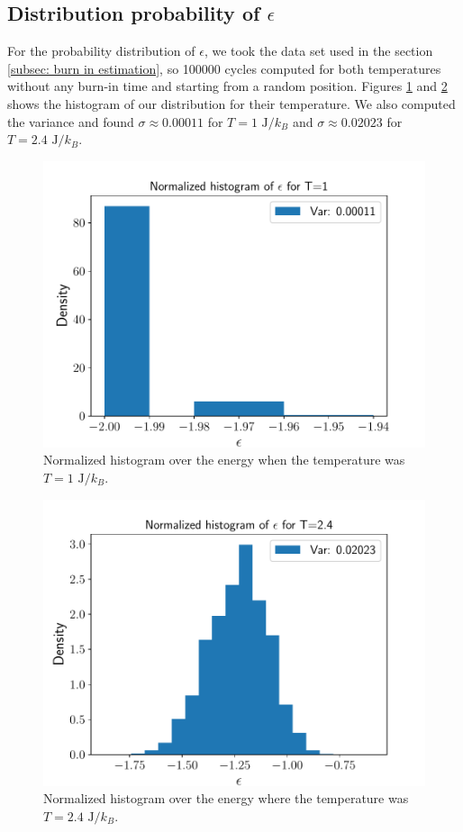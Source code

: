 \documentclass[english,notitlepage,reprint,nofootinbib]{revtex4-2}  %
\begin{document}
	\subsection{Distribution probability of $\epsilon$}\label{subsec:dist probability}

	For the probability distribution of $\epsilon$, we took the data set used in the section
	\ref{subsec: burn in estimation}, so 100000 cycles computed for both temperatures
	without any burn-in time and starting from a random position. Figures \ref{fig:hist1} and \ref{fig:hist2} shows the histogram of our distribution for their temperature.
	We also computed the variance and found $\sigma\approx0.00011$ for $T=1 \text{ J}/k_{B}$ and
	$\sigma\approx0.02023$ for $T=2.4 \text{ J}/k_{B}$.

	\begin{figure}[h!]
		\centering
		\includegraphics[scale=0.55]{figures/Histo_T1.pdf}
		\caption{Normalized histogram over the energy when the temperature was $T=1 \text{ J}/k_{B}$.}
		\label{fig:hist1}
	\end{figure}

	\begin{figure}[h!]
		\centering
		\includegraphics[scale=0.55]{figures/Histo_T2.pdf}
		\caption{Normalized histogram over the energy where the temperature was $T=2.4 \text{ J}/k_{B}$.}
		\label{fig:hist2}
	\end{figure}
\end{document}
